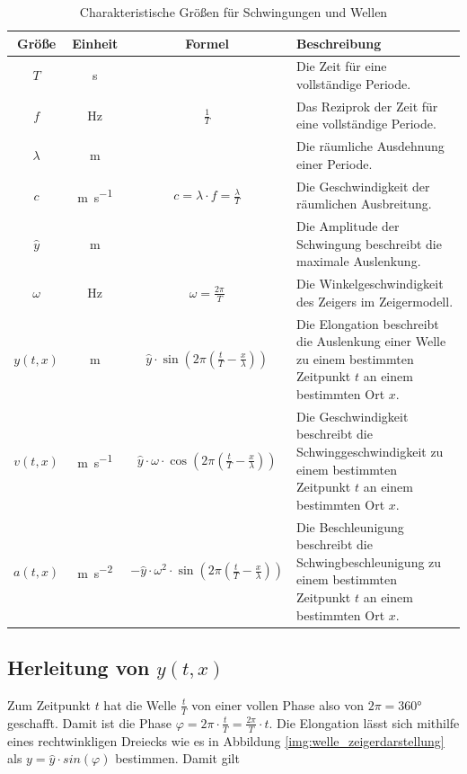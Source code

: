 \documentclass[a4paper]{article}
\begin{document}
	
			\begin{table}[H]
				\def\arraystretch{1.5}
				 \begin{tabularx}{\textwidth}{|c|c|c|X|}\hline
					Größe & Einheit & Formel & Beschreibung \\\hline
					$T$ & \si{\second} & & Die Zeit für eine vollständige Periode.\\\hline
					$f$ & \si{\hertz}  & $\frac{1}{T}$ & Das Reziprok der Zeit für eine vollständige Periode.\\\hline
					$\lambda$ & \si{\meter} & & Die räumliche Ausdehnung einer Periode.\\\hline
					$c$ & \si{\meter\per\second} & $c=\lambda\cdot f = \frac{\lambda}{T}$ & Die Geschwindigkeit der räumlichen Ausbreitung.\\\hline
					$\hat{y}$ & \si{\meter}& & Die Amplitude der Schwingung beschreibt die maximale Auslenkung.\\\hline
					$\omega$ & \si{\hertz} & $\omega=\frac{2\pi}{T}$ & Die Winkelgeschwindigkeit des Zeigers im Zeigermodell.\\\hline
					$y(t, x)$ & \si{\meter} & $\hat{y}\cdot\sin\left(2\pi\left(\frac{t}{T}-\frac{x}{\lambda} \right)\right)$ & Die Elongation beschreibt die Auslenkung einer Welle zu einem bestimmten Zeitpunkt $t$ an einem bestimmten Ort $x$.\\\hline
					$v(t, x)$ & \si{\meter\per\second} & $\hat{y}\cdot\omega\cdot\cos\left(2\pi\left(\frac{t}{T}-\frac{x}{\lambda} \right)\right)$ & Die Geschwindigkeit beschreibt die Schwinggeschwindigkeit zu einem bestimmten Zeitpunkt $t$ an einem bestimmten Ort $x$.\\\hline
					$a(t, x)$ & \si{\meter\per\second\squared} & $-\hat{y}\cdot\omega^2\cdot\sin\left(2\pi\left(\frac{t}{T}-\frac{x}{\lambda} \right)\right)$ & Die Beschleunigung beschreibt die Schwingbeschleunigung zu einem bestimmten Zeitpunkt $t$ an einem bestimmten Ort $x$.\\\hline
				\end{tabularx}
				\caption {Charakteristische Größen für Schwingungen und Wellen}
				\label{table:wellen_grossen}
			\end{table}	
	
		\subsection{Herleitung von $y(t, x)$}
			Zum Zeitpunkt $t$ hat die Welle $\frac{t}{T}$ von einer vollen Phase also von $2\pi = 360\si{\degree}$ geschafft. Damit ist die Phase $\varphi = 2\pi\cdot\frac{t}{T} = \frac{2\pi}{T}\cdot t$. Die Elongation lässt sich mithilfe eines rechtwinkligen Dreiecks wie es in Abbildung \ref{img:welle_zeigerdarstellung} als $y=\hat{y}\cdot sin\left(\varphi\right)$ bestimmen. Damit gilt
			
\end{document}
